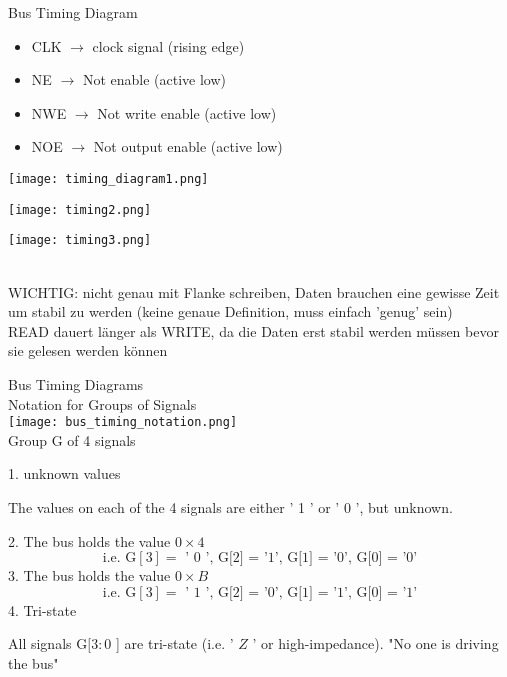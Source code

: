 \begin{definition}{Bus Timing Diagram}
    \begin{itemize}
        \item CLK $\rightarrow$ clock signal (rising edge)
        \item NE $\rightarrow$ Not enable (active low)
        \item NWE $\rightarrow$ Not write enable (active low)
        \item NOE $\rightarrow$ Not output enable (active low)
    \end{itemize}
    \texttt{[image: timing\_diagram1.png]}

    \begin{minipage}{0.4\linewidth}
        \texttt{[image: timing2.png]}
    \end{minipage}
    \begin{minipage}{0.54\linewidth}
        \texttt{[image: timing3.png]}
    \end{minipage}
    \vspace{1mm}\\
    WICHTIG: nicht genau mit Flanke schreiben, Daten brauchen eine gewisse Zeit um stabil zu werden (keine genaue Definition, muss einfach 'genug' sein)\\
    READ dauert länger als WRITE, da die Daten erst stabil werden müssen bevor sie gelesen werden können
\end{definition}

\begin{theorem}{Bus Timing Diagrams}\\ Notation for Groups of Signals\\
    \texttt{[image: bus\_timing\_notation.png]}\\
    Group G of 4 signals

1. unknown values

The values on each of the 4 signals are either ' 1 ' or ' 0 ', but unknown.

2. The bus holds the value $0 \times 4$
$$
\text { i.e. } \mathrm{G}[3]=\text { ' } 0 \text { ', G[2] = '1', G[1] = '0', G[0] = '0' }
$$
3. The bus holds the value $0 \times B$
$$
\text { i.e. } \mathrm{G}[3]=\text { ' } 1 \text { ', G[2] = '0', G[1] = '1', G[0] = '1' }
$$
4. Tri-state

All signals $\mathrm{G}[3: 0$ ] are tri-state (i.e. ' $Z$ ' or high-impedance). "No one is driving the bus"
\end{theorem}

